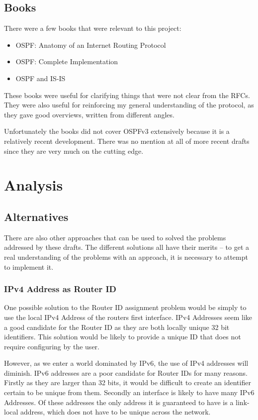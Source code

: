 \documentclass[12pt]{report}
\begin{document}
\section{Books}
There were a few books that were relevant to this project:
\begin{itemize}
  \item OSPF: Anatomy of an Internet Routing Protocol \cite{OSPFAIRP}
  \item OSPF: Complete Implementation \cite{OSPFCI}
  \item OSPF and IS-IS \cite{OSPFvsISIS}
\end{itemize}

These books were useful for clarifying things that were not clear from the
RFCs. They were also useful for reinforcing my general understanding of the
protocol, as they gave good overviews, written from different angles. 

Unfortunately the books did not cover OSPFv3 extensively because it is a
relatively recent development. There was no mention at all of more recent
drafts since they are very much on the cutting edge.

\chapter{Analysis}

\section{Alternatives}
There are also other approaches that can be used to solved the problems
addressed by these drafts. The different solutions all have their merits -- to
get a real understanding of the problems with an approach, it is necessary to
attempt to implement it.

\subsection{IPv4 Address as Router ID}
One possible solution to the Router ID assignment problem would be simply to use
the local IPv4 Address of the routers first interface. IPv4 Addresses seem like
a good candidate for the Router ID as they are both locally unique 32 bit
identifiers. This solution would be likely to provide a unique ID that does not
require configuring by the user.
 
However, as we enter a world dominated by IPv6, the use of IPv4 addresses will
diminish. IPv6 addresses are a poor candidate for Router IDs for many reasons.
Firstly as they are larger than 32 bits, it would be difficult to create an identifier
certain to be unique from them. Secondly an interface is likely to have
many IPv6 Addresses. Of these addresses the only address it is guaranteed to
have is a link-local address, which does not have to be unique across the
network. 
\end{document}
